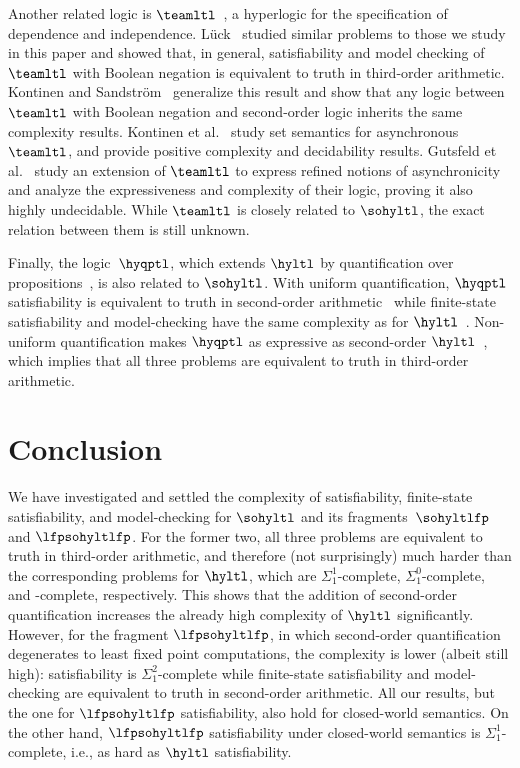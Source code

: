 Another related logic is $\teamltl$~\cite{DBLP:conf/mfcs/KrebsMV018}, a hyperlogic for the specification of dependence and independence. Lück~\cite{Luck20} studied similar problems to those we study in this paper and showed that, in general, satisfiability and model checking of $\teamltl$ with Boolean negation is equivalent to truth in third-order arithmetic. Kontinen and Sandström~\cite{DBLP:conf/wollic/KontinenS21} generalize this result and show that any logic between $\teamltl$ with Boolean negation and second-order logic inherits the same complexity results. 
Kontinen et al.~\cite{DBLP:conf/mfcs/KontinenSV23} study set semantics for asynchronous $\teamltl$, and provide positive complexity and decidability results. Gutsfeld et al.~\cite{GutsfeldMOV22} study an extension of $\teamltl$ to express refined notions of asynchronicity and analyze the expressiveness and complexity of their logic, proving it also highly undecidable. 
While $\teamltl$ is closely related to $\sohyltl$, the exact relation between them is still unknown.

Finally, the logic~$\hyqptl$, which extends $\hyltl$ by quantification over propositions~\cite{Rabe16diss}, is also related to $\sohyltl$. 
With uniform quantification, $\hyqptl$ satisfiability is equivalent to truth in second-order arithmetic~\cite{regaud2024complexityhyperqptl} while finite-state satisfiability and model-checking have the same complexity as for $\hyltl$~\cite{FinkbeinerH16,Rabe16diss}. Non-uniform quantification makes $\hyqptl$ as expressive as second-order $\hyltl$~\cite{regaud2024complexityhyperqptl}, which implies that all three problems are equivalent to truth in third-order arithmetic.

\section{Conclusion}
\label{sec_conc}
We have investigated and settled the complexity of satisfiability, finite-state satisfiability, and model-checking for $\sohyltl$ and its fragments~$\sohyltlfp$ and $\lfpsohyltlfp$.
For the former two, all three problems are equivalent to truth in third-order arithmetic, and therefore (not surprisingly) much harder than the corresponding problems for $\hyltl$, which are  $\Sigma_1^1$-complete, $\Sigma_1^0$-complete, and \tower-complete, respectively.
This shows that the addition of second-order quantification increases the already high complexity of $\hyltl$ significantly. 
However, for the fragment $\lfpsohyltlfp$, in which second-order quantification degenerates to least fixed point computations, the complexity is lower (albeit still high): satisfiability is $\Sigma_1^2$-complete while finite-state satisfiability and model-checking are equivalent to truth in second-order arithmetic.
All our results, but the one for $\lfpsohyltlfp$ satisfiability, also hold for closed-world semantics. 
On the other hand, $\lfpsohyltlfp$ satisfiability under closed-world semantics is  $\Sigma_1^1$-complete, i.e., as hard as $\hyltl$ satisfiability. 

